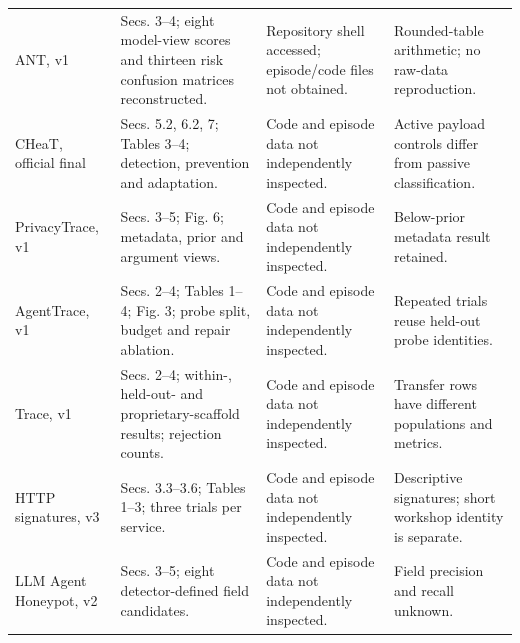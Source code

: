 \begin{table}[!tp]
\begin{tabularx}{\textwidth}{@{}P{.17\textwidth}P{.32\textwidth}P{.25\textwidth}Y@{}}
ANT, v1 & Secs. 3--4; eight model-view scores and thirteen risk confusion matrices reconstructed. & Repository shell accessed; episode/code files not obtained. & Rounded-table arithmetic; no raw-data reproduction. \\\addlinespace[3pt]
CHeaT, official final & Secs. 5.2, 6.2, 7; Tables 3--4; detection, prevention and adaptation. & Code and episode data not independently inspected. & Active payload controls differ from passive classification. \\\addlinespace[3pt]
PrivacyTrace, v1 & Secs. 3--5; Fig. 6; metadata, prior and argument views. & Code and episode data not independently inspected. & Below-prior metadata result retained. \\\addlinespace[3pt]
AgentTrace, v1 & Secs. 2--4; Tables 1--4; Fig. 3; probe split, budget and repair ablation. & Code and episode data not independently inspected. & Repeated trials reuse held-out probe identities. \\\addlinespace[3pt]
Trace, v1 & Secs. 2--4; within-, held-out- and proprietary-scaffold results; rejection counts. & Code and episode data not independently inspected. & Transfer rows have different populations and metrics. \\\addlinespace[3pt]
HTTP signatures, v3 & Secs. 3.3--3.6; Tables 1--3; three trials per service. & Code and episode data not independently inspected. & Descriptive signatures; short workshop identity is separate. \\\addlinespace[3pt]
LLM Agent Honeypot, v2 & Secs. 3--5; eight detector-defined field candidates. & Code and episode data not independently inspected. & Field precision and recall unknown. \\\bottomrule
\end{tabularx}\end{table}
